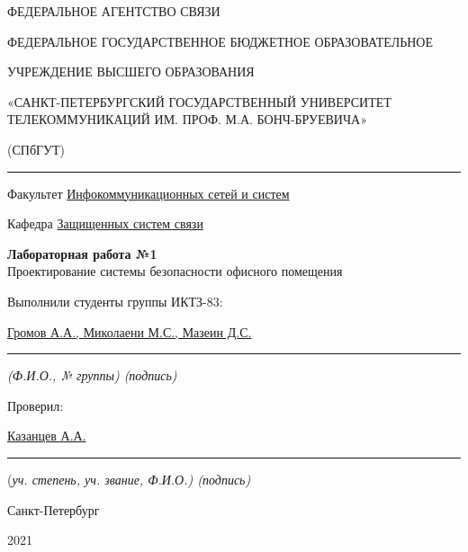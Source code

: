\documentclass[a4paper,14pt]{extarticle}
\begin{document}
    \begin{center}
        \thispagestyle{empty}
        \begin{singlespace}
        ФЕДЕРАЛЬНОЕ АГЕНТСТВО СВЯЗИ

        ФЕДЕРАЛЬНОЕ ГОСУДАРСТВЕННОЕ БЮДЖЕТНОЕ ОБРАЗОВАТЕЛЬНОЕ

        УЧРЕЖДЕНИЕ ВЫСШЕГО ОБРАЗОВАНИЯ

        «САНКТ-ПЕТЕРБУРГСКИЙ ГОСУДАРСТВЕННЫЙ УНИВЕРСИТЕТ ТЕЛЕКОММУНИКАЦИЙ ИМ. ПРОФ. М.А. БОНЧ-БРУЕВИЧА»

        (СПбГУТ)
        \end{singlespace}
        \vspace{-1ex}
        \rule{\textwidth}{0.4pt}
        \vspace{-5ex}

        Факультет \underline{Инфокоммуникационных сетей и систем}

        Кафедра \underline{Защищенных систем связи}
        \vspace{10ex}

        \textbf{Лабораторная работа №1}\\
        Проектирование системы безопасности офисного помещения
        


    \end{center}
    \vspace{4ex}
    \begin{flushright}
    \parbox{10 cm}{
    \begin{flushleft}
        Выполнили студенты группы ИКТЗ-83:

        \underline{Громов А.А., Миколаени М.С., Мазеин Д.С.} \hfill \rule[-0.85ex]{0.1\textwidth}{0.6pt}

        \footnotesize \textit{ (Ф.И.О., № группы) \hfill (подпись)} \normalsize

        Проверил:

        \underline{Казанцев А.А.} \hfill \rule[-0.85ex]{0.1\textwidth}{0.6pt}

        (\footnotesize \textit{уч. степень, уч. звание, Ф.И.О.) \hfill (подпись)} \normalsize

    \end{flushleft}
    }
    \end{flushright}
    \begin{center}
        \vfill
        Санкт-Петербург

        2021

    \end{center}
    \newpage
\end{document}
